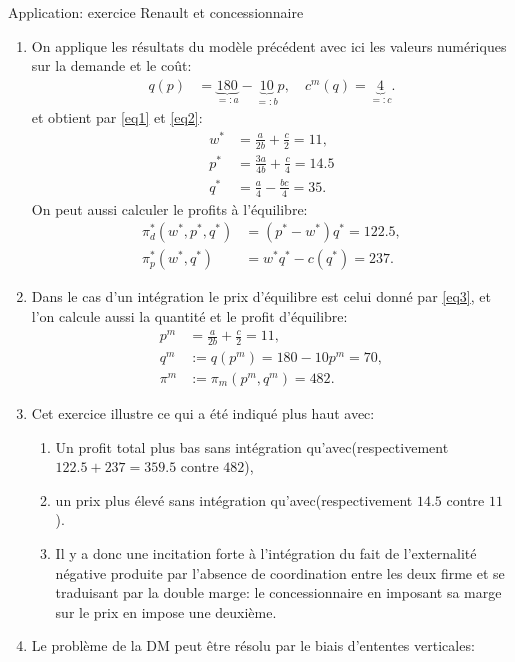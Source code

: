 \begin{frame}[allowframebreaks]{Application: exercice Renault et concessionnaire}
\begin{enumerate}
\item On applique les résultats du modèle précédent avec ici les valeurs numériques 
sur la demande et le coût:
\begin{align*}
    q(p) &= \underbrace{180}_{=:a} - \underbrace{10}_{=:b}p, \quad c^m(q) = \underbrace{4}_{=:c}.
\end{align*}
et obtient par \eqref{eq1} et \eqref{eq2}:
\begin{align*}
    w^* &= \frac{a}{2b} + \frac{c}{2} = 11,\\
    p^* &=  \frac{3a}{4b} +\frac{c}{4} = 14.5\\
    q^* &= \frac{a}{4} - \frac{bc}{4} = 35.
\end{align*}
On peut aussi calculer le profits à l'équilibre: 
\begin{align*}
\pi_d^*(w^*, p^*, q^*) &= (p^* - w^*) q^* = 122.5,\\
\pi_p^*(w^*, q^*) &= w^*q^* - c(q^*) = 237.
\end{align*}
\item Dans le cas d'un intégration le prix d'équilibre est celui donné par \eqref{eq3}, et l'on calcule aussi la 
quantité et le profit d'équilibre:
\begin{align*}
p^m &=  \frac{a}{2b} + \frac{c}{2} = 11,\\
q^m &:=q(p^m) = 180 - 10p^m = 70,\\
\pi^m &:= \pi_m(p^m, q^m)= 482.
\end{align*}
\item Cet exercice illustre ce qui a été indiqué plus haut avec: 
\begin{enumerate}[$\star$]
\item Un profit total plus bas sans intégration qu'avec(respectivement $122.5 + 237 = 359.5$ contre $482$),
\item un prix plus élevé sans intégration qu'avec(respectivement $14.5$ contre $11$).
\item Il y a donc une incitation forte à l'intégration du fait de l'externalité 
négative produite par l'absence de coordination entre les deux firme et se traduisant 
par la double marge: le concessionnaire en imposant sa marge sur le prix en impose une deuxième. 
\end{enumerate}
\item Le problème de la DM peut être résolu par le biais d'ententes verticales:

\end{enumerate}
\end{frame}
